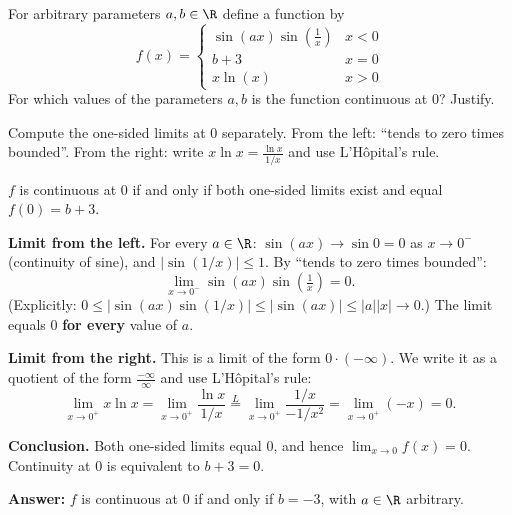 
\begin{question}
For arbitrary parameters $a,b\in\R$ define a function by
\[ f(x)=\begin{cases} \sin(ax)\sin(\frac{1}{x}) & x<0\\ b+3 & x=0\\ x\ln(x) & x>0 \end{cases} \]
For which values of the parameters $a,b$ is the function continuous at $0$? Justify.
\end{question}

\begin{hint}
Compute the one-sided limits at $0$ separately. From the left: ``tends to zero times bounded''. From the right: write $x\ln x=\frac{\ln x}{1/x}$ and use L'Hôpital's rule.
\end{hint}

\begin{solution}
$f$ is continuous at $0$ if and only if both one-sided limits exist and equal $f(0)=b+3$.

\textbf{Limit from the left.} For every $a\in\R$: $\sin(ax)\to\sin0=0$ as $x\to0^-$ (continuity of sine), and $|\sin(1/x)|\le1$. By ``tends to zero times bounded'':
\[ \lim_{x\to0^-}\sin(ax)\sin\left(\tfrac1x\right)=0. \]
(Explicitly: $0\le|\sin(ax)\sin(1/x)|\le|\sin(ax)|\le|a||x|\to0$.) The limit equals $0$ \textbf{for every} value of $a$.

\textbf{Limit from the right.} This is a limit of the form $0\cdot(-\infty)$. We write it as a quotient of the form $\frac{-\infty}{\infty}$ and use L'Hôpital's rule:
\[ \lim_{x\to0^+}x\ln x=\lim_{x\to0^+}\frac{\ln x}{1/x}\overset{L}{=}\lim_{x\to0^+}\frac{1/x}{-1/x^2}=\lim_{x\to0^+}(-x)=0. \]

\textbf{Conclusion.} Both one-sided limits equal $0$, and hence $\lim_{x\to0}f(x)=0$. Continuity at $0$ is equivalent to $b+3=0$.

\textbf{Answer:} $f$ is continuous at $0$ if and only if $\boxed{b=-3}$, with $a\in\R$ arbitrary.
\end{solution}
